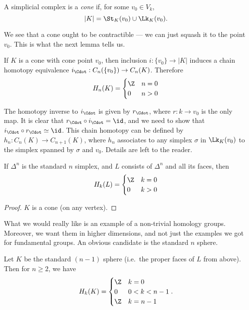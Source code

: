 \documentclass[a4paper]{article}
\begin{document}
\begin{defi}[Cone]
  A simplicial complex is a \emph{cone} if, for some $v_0 \in V_k$,
  \[
    |K| = \St_K(v_0) \cup \Lk_K(v_0).
  \]
\end{defi}
\begin{center}
\end{center}
We see that a cone ought to be contractible --- we can just squash it to the point $v_0$. This is what the next lemma tells us.
\begin{lemma}
  If $K$ is a cone with cone point $v_0$, then inclusion $i: \{v_0\} \to |K|$ induces a chain homotopy equivalence $i_{\Cdot}: C_n (\{v_0\}) \to C_n(K)$. Therefore
  \[
    H_n(K) =
    \begin{cases}
      \Z & n = 0\\
      0 & n > 0
    \end{cases}
  \]
\end{lemma}
The homotopy inverse to $i_{\Cdot}$ is given by $r_{\Cdot}$, where $r: k \to v_0$ is the only map. It is clear that $r_{\Cdot} \circ i_{\Cdot} = \id$, and we need to show that $i_{\Cdot} \circ r_{\Cdot} \simeq \id$. This chain homotopy can be defined by $h_n: C_n(K) \to C_{n + 1}(K)$, where $h_n$ associates to any simplex $\sigma$ in $\Lk_K(v_0)$ to the simplex spanned by $\sigma$ and $v_0$. Details are left to the reader.

\begin{cor}
  If $\Delta^n$ is the standard $n$ simplex, and $L$ consists of $\Delta^n$ and all its faces, then
  \[
    H_k(L) =
    \begin{cases}
      \Z & k = 0\\
      0 & k > 0
    \end{cases}
  \]
\end{cor}

\begin{proof}
  $K$ is a cone (on any vertex).
\end{proof}

What we would really like is an example of a non-trivial homology groups. Moreover, we want them in higher dimensions, and not just the examples we got for fundamental groups. An obvious candidate is the standard $n$ sphere.
\begin{cor}
  Let $K$ be the standard $(n - 1)$ sphere (i.e.\ the proper faces of $L$ from above). Then for $n \geq 2$, we have
  \[
    H_k(K) =
    \begin{cases}
      \Z & k = 0\\
      0 & 0 < k < n - 1\\
      \Z & k = n - 1
    \end{cases}.
  \]
\end{cor}
\end{document}
